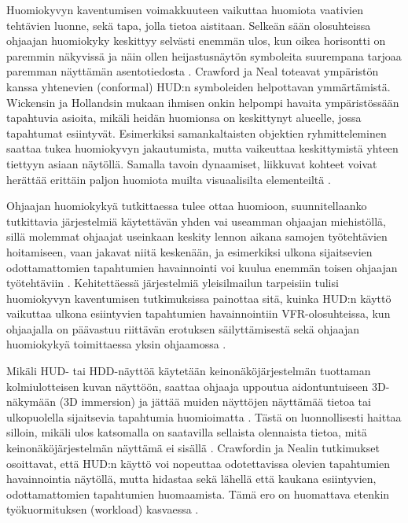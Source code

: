 \documentclass[utf8,bachelor,manualbib]{gradu3}
\begin{document}
Huomiokyvyn kaventumisen voimakkuuteen vaikuttaa huomiota vaativien tehtävien luonne, sekä tapa, jolla tietoa aistitaan. Selkeän sään olosuhteissa ohjaajan huomiokyky keskittyy selvästi enemmän ulos, kun oikea horisontti on paremmin näkyvissä ja näin ollen heijastusnäytön symboleita suurempana tarjoaa paremman näyttämän asentotiedosta \citep{ververswickens1998}. Crawford ja Neal \citeyearpar{crawfordneal2006} toteavat ympäristön kanssa yhtenevien (conformal) HUD:n symboleiden helpottavan ymmärtämistä. Wickensin ja Hollandsin mukaan \citeyearpar{wickenshollands2000} ihmisen onkin helpompi havaita ympäristössään tapahtuvia asioita, mikäli heidän huomionsa on keskittynyt alueelle, jossa tapahtumat esiintyvät. Esimerkiksi samankaltaisten objektien ryhmitteleminen saattaa tukea huomiokyvyn jakautumista, mutta vaikeuttaa keskittymistä yhteen tiettyyn asiaan näytöllä. Samalla tavoin dynaamiset, liikkuvat kohteet voivat herättää erittäin paljon huomiota muilta visuaalisilta elementeiltä \citep{crawfordneal2006}.

Ohjaajan huomiokykyä tutkittaessa tulee ottaa huomioon, suunnitellaanko tutkittavia järjestelmiä käytettävän yhden vai useamman ohjaajan miehistöllä, sillä molemmat ohjaajat useinkaan keskity lennon aikana samojen työtehtävien hoitamiseen, vaan jakavat niitä keskenään, ja esimerkiksi ulkona sijaitsevien odottamattomien tapahtumien havainnointi voi kuulua enemmän toisen ohjaajan työtehtäviin \citep{crawfordneal2006}. Kehitettäessä järjestelmiä yleisilmailun tarpeisiin tulisi huomiokyvyn kaventumisen tutkimuksissa painottaa sitä, kuinka HUD:n käyttö vaikuttaa ulkona esiintyvien tapahtumien havainnointiin VFR-olosuhteissa, kun ohjaajalla on päävastuu riittävän erotuksen säilyttämisestä \citep{ververswickens1998} sekä ohjaajan huomiokykyä toimittaessa yksin ohjaamossa \citep{crawfordneal2006}. 

Mikäli HUD- tai HDD-näyttöä käytetään keinonäköjärjestelmän tuottaman kolmiulotteisen kuvan näyttöön, saattaa ohjaaja uppoutua aidontuntuiseen 3D-näkymään (3D immersion) ja jättää muiden näyttöjen näyttämää tietoa tai ulkopuolella sijaitsevia tapahtumia huomioimatta \citep{olmosym2000}. Tästä on luonnollisesti haittaa silloin, mikäli ulos katsomalla on saatavilla sellaista olennaista tietoa, mitä keinonäköjärjestelmän näyttämä ei sisällä \citep{foylehooey2003}. Crawfordin ja Nealin \citeyearpar{crawfordneal2006} tutkimukset osoittavat, että HUD:n käyttö voi nopeuttaa odotettavissa olevien tapahtumien havainnointia näytöllä, mutta hidastaa sekä lähellä että kaukana esiintyvien, odottamattomien tapahtumien huomaamista. Tämä ero on huomattava etenkin työkuormituksen (workload) kasvaessa \citep{larishwickens1991}.
\end{document}
